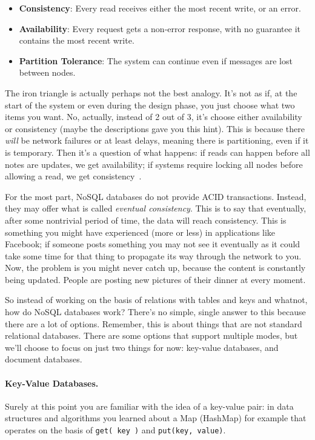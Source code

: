 \begin{itemize}
	\item \textbf{Consistency}: Every read receives either the most recent write, or an error.
	\item \textbf{Availability}: Every request gets a non-error response, with no guarantee it contains the most recent write.
	\item \textbf{Partition Tolerance}: The system can continue even if messages are lost between nodes.
\end{itemize}

The iron triangle is actually perhaps not the best analogy. It's not as if, at the start of the system or even during the design phase, you just choose what two items you want. No, actually, instead of 2 out of 3, it's choose either availability or consistency (maybe the descriptions gave you this hint). This is because there \textit{will} be network failures or at least delays, meaning there is partitioning, even if it is temporary. Then it's a question of what happens: if reads can happen before all notes are updates, we get availability; if systems require locking all nodes before allowing a read, we get consistency~\cite{bettercap}.

For the most part, NoSQL databases do not provide ACID transactions. Instead, they may offer what is called \textit{eventual consistency}. This is to say that eventually, after some nontrivial period of time, the data will reach consistency. This is something you might have experienced (more or less) in applications like Facebook; if someone posts something you may not see it eventually as it could take some time for that thing to propagate its way through the network to you. Now, the problem is you might never catch up, because the content is constantly being updated. People are posting new pictures of their dinner at every moment.

So instead of working on the basis of relations with tables and keys and whatnot, how do NoSQL databases work? There's no simple, single answer to this because there are a lot of options. Remember, this is about things that are not standard relational databases. There are some options that support multiple modes, but we'll choose to focus on just two things for now: key-value databases, and document databases.

\paragraph{Key-Value Databases.} Surely at this point you are familiar with the idea of a key-value pair: in data structures and algorithms you learned about a Map (HashMap) for example that operates on the basis of \texttt{get( key )} and \texttt{put(key, value)}. 

